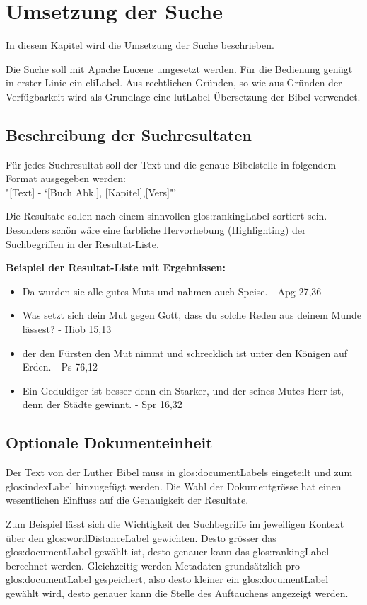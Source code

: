 \chapter{Umsetzung der Suche}
In diesem Kapitel wird die Umsetzung der Suche beschrieben.

Die Suche soll mit Apache Lucene umgesetzt werden. Für die Bedienung genügt in erster Linie ein \gls{cliLabel}.
Aus rechtlichen Gründen, so wie aus Gründen der Verfügbarkeit wird als Grundlage eine \gls{lutLabel}-Übersetzung der Bibel verwendet.

\section{Beschreibung der Suchresultaten}
Für jedes Suchresultat soll der Text und die genaue Bibelstelle in folgendem Format ausgegeben werden:\\
"[Text] - `[Buch Abk.], [Kapitel],[Vers]"'

Die Resultate sollen nach einem sinnvollen \gls{glos:rankingLabel} sortiert sein.
Besonders schön wäre eine farbliche Hervorhebung (Highlighting) der Suchbegriffen in der Resultat-Liste.

\textbf{Beispiel der Resultat-Liste mit Ergebnissen:}
\begin{itemize}
	\item Da wurden sie alle gutes Muts und nahmen auch Speise. - Apg 27,36
	\item Was setzt sich dein Mut gegen Gott, dass du solche Reden aus deinem Munde lässest? - Hiob 15,13
	\item der den Fürsten den Mut nimmt und schrecklich ist unter den Königen auf Erden. - Ps 76,12
	\item Ein Geduldiger ist besser denn ein Starker, und der seines Mutes Herr ist, denn der Städte gewinnt. - Spr 16,32
\end{itemize}


\section{Optionale Dokumenteinheit}
Der Text von der Luther Bibel muss in \glspl{glos:documentLabel} eingeteilt und zum \gls{glos:indexLabel} hinzugefügt werden.
Die Wahl der Dokumentgrösse hat einen wesentlichen Einfluss auf die Genauigkeit der Resultate.

Zum Beispiel lässt sich die Wichtigkeit der Suchbegriffe im jeweiligen Kontext über den \gls{glos:wordDistanceLabel} gewichten.
Desto grösser das \gls{glos:documentLabel} gewählt ist, desto genauer kann das \gls{glos:rankingLabel} berechnet werden.
Gleichzeitig werden Metadaten grundsätzlich pro \gls{glos:documentLabel} gespeichert, also desto kleiner ein \gls{glos:documentLabel} gewählt wird, desto genauer kann die Stelle des Auftauchens angezeigt werden.

